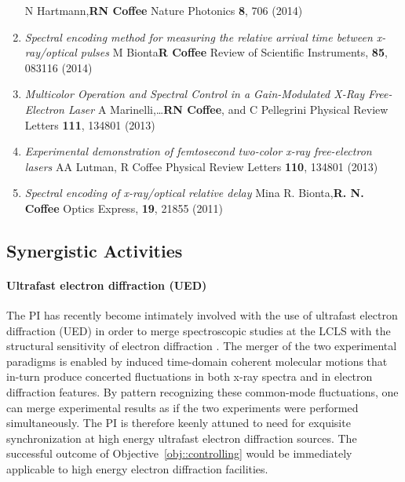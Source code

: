 \begin{enumerate}
N Hartmann,\etal \textbf{RN Coffee}
Nature Photonics \textbf{8}, 706 (2014)
\item \textit{Spectral encoding method for measuring the relative arrival time between x-ray/optical pulses}
M Bionta\etal \textbf{R Coffee}
Review of Scientific Instruments, \textbf{85}, 083116 (2014)
\item \textit{Multicolor Operation and Spectral Control in a Gain-Modulated X-Ray Free-Electron Laser}
A Marinelli,\etal\ldots \textbf{RN Coffee}, and C Pellegrini
Physical Review Letters \textbf{111}, 134801 (2013)
\item \textit{Experimental demonstration of femtosecond two-color x-ray free-electron lasers}
AA Lutman, R Coffee\etal
Physical Review Letters \textbf{110}, 134801 (2013)
\item \textit{Spectral encoding of x-ray/optical relative delay}
Mina R. Bionta,\etal \textbf{R. N. Coffee}
Optics Express, \textbf{19}, 21855 (2011)
\end{enumerate}


\subsection*{Synergistic Activities}

\paragraph*{Ultrafast electron diffraction (UED)}
The PI has recently become intimately involved with the use of ultrafast electron diffraction (UED) in order to merge spectroscopic studies at the LCLS with the structural sensitivity of electron diffraction \cite{ued_rsi2015,Jie2016}.
The merger of the two experimental paradigms is enabled by induced time-domain coherent molecular motions that in-turn produce concerted fluctuations in both x-ray spectra and in electron diffraction features.
By pattern recognizing these common-mode fluctuations, one can merge experimental results as if the two experiments were performed simultaneously.
The PI is therefore keenly attuned to need for exquisite synchronization at high energy ultrafast electron diffraction sources.
The successful outcome of Objective~\ref{obj::controlling} would be immediately applicable to high energy electron diffraction facilities.%


